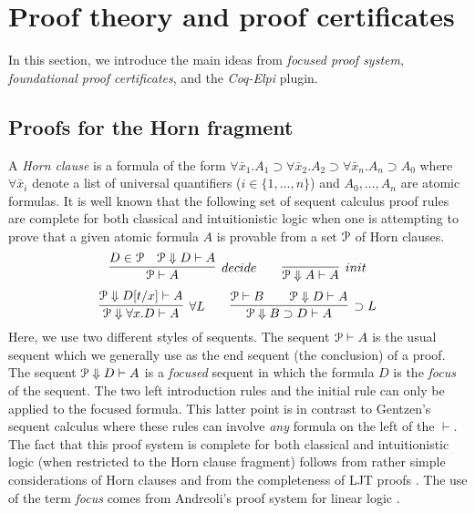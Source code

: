 
\section{Proof theory and proof certificates}
\label{sec:three}

In this section, we introduce the main ideas from \emph{focused proof
  system}, \emph{foundational proof certificates}, and the
\emph{Coq-Elpi} plugin.

\subsection{Proofs for the Horn fragment}
\label{ssec:focused}


A \emph{Horn clause} is a formula of the form $\forall \bar
x_1. A_1\supset \forall \bar x_2. A_2\supset \forall \bar
x_n. A_n\supset A_0$ where $\forall\bar x_i$ denote a list of
universal quantifiers ($i\in\{1,\ldots,n\}$) and $A_0,\ldots,A_n$ are
atomic formulas.  It is well known that the following set of sequent
calculus proof rules are complete for both classical and
intuitionistic logic when one is attempting to prove that a given
atomic formula $A$ is provable from a  set ${\mathcal P}$ of Horn
clauses. 
\[
  \infer[decide]{\Pscr\vdash A}
                {D \in \Pscr\quad \Pscr\Downarrow D\vdash A}
  \qquad
  \infer[init]{\Pscr\Downarrow A\vdash A}{}
\]
\[
  \infer[\forall L]{\Pscr\Downarrow\forall x. D\vdash A}
        {\Pscr\Downarrow D[t/x]\vdash A}
  \qquad
  \infer[\supset L]{\Pscr\Downarrow B\supset D\vdash A}
        {\Pscr\vdash B\qquad \Pscr\Downarrow D\vdash A}
\]
Here, we use two different styles of sequents.  The sequent
${\mathcal P}\vdash A$ is the usual sequent which we generally use as the end
sequent (the conclusion) of a proof.  The sequent ${\mathcal P}\Downarrow
D\vdash A$ is a \emph{focused} sequent in which the formula $D$ is the
\emph{focus} of the sequent.  The two left introduction rules and the
initial rule can only be applied to the focused formula.  This latter
point is in contrast to Gentzen's sequent calculus where these rules
can involve \emph{any} formula on the left of the $\vdash$.  The fact
that this proof system is complete for both classical and
intuitionistic logic (when restricted to the Horn clause fragment)
follows from rather simple considerations of Horn clauses
\cite{nadathur90jacm} and from the completeness of LJT proofs
\cite{Herbelin94}.  The use of the term \emph{focus} comes from
Andreoli's proof system for linear logic \cite{andreoli92jlc}.

